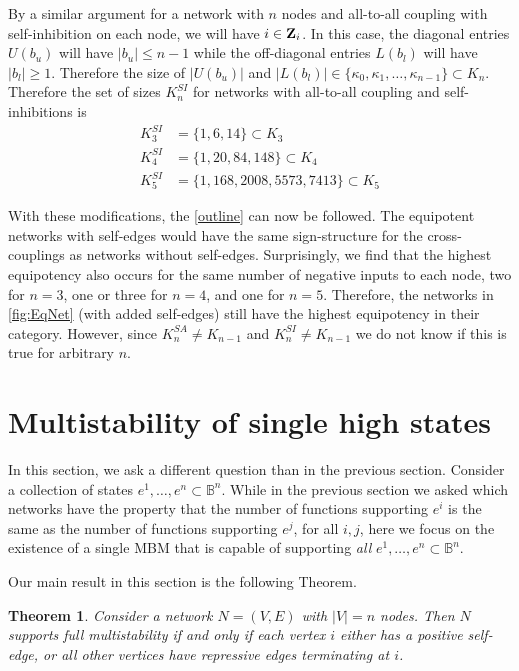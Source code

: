 \documentclass[12pt]{amsart}
\newcommand{\bZ}{{\bf Z}}
\newcommand{\bbB}{\mathbb{B}}
\newtheorem{thm}{Theorem}[section]
\theoremstyle{definition}
\begin{document}
By a similar argument for a network with $n$ nodes and all-to-all coupling with self-inhibition on each node, we will have $i \in \bZ_i$. In this case, the diagonal entries $U(b_u)$ will have $|b_u| \leq n-1$ while the off-diagonal entries $L(b_l)$ will have $|b_l| \geq 1$. Therefore the size of $|U(b_u)|$ and $|L(b_l)| \in \{\kappa_0, \kappa_1, \ldots, \kappa_{n-1}\} \subset K_n$. 
Therefore the set of sizes $K_n^{SI}$ for networks with all-to-all coupling and self-inhibitions is
\begin{align*}
    K_{3}^{SI}&=\{1,6,14\} \subset K_3\\ 
    K_{4}^{SI}&=\{1, 20,84, 148\} \subset K_4\\ 
    K_{5}^{SI}&=\{1,168,2008,5573,7413\} \subset K_5
\end{align*}

With these modifications, the \cref{outline} can now be followed. The equipotent networks with self-edges would have the same sign-structure for the cross-couplings as networks without self-edges. Surprisingly, we find that the highest equipotency also occurs for the same number of negative inputs to each node, two for $n=3$, one or three for $n=4$, and one for $n=5$. Therefore, the networks in \cref{fig:EqNet} (with added self-edges) still have the highest equipotency in their category. However, since $K_{n}^{SA} \not = K_{n-1}$ and $K_{n}^{SI} \not = K_{n-1}$ we do not know if this is true for arbitrary $n$. 


\section{Multistability of single high states} \label{sec:multistability}

In this section, we ask a different question than in the previous section. 
Consider a collection of states $e^1, \ldots, e^n \subset \bbB^n$. While in the previous section we asked which networks have the property that the number of functions supporting $e^i$ is the same as the number of functions supporting $e^j$, for all $i,j$, here we focus on the existence of a single MBM that is capable of supporting \textit{all} $e^1, \ldots, e^n \subset \bbB^n$.

Our main result in this section is the following Theorem.

\begin{thm}\label{thm:multistable}
Consider a network $N=(V,E)$ with $|V|=n$ nodes. 
Then $N$ supports full multistability if and only if each vertex $i$ either has a positive self-edge, or all other vertices have repressive edges terminating at $i$. 
\end{thm}
\end{document}
